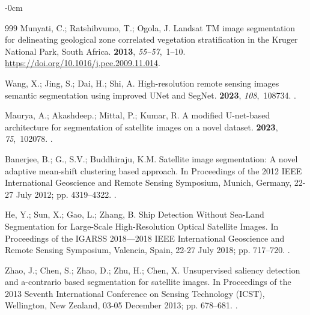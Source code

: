 \documentclass[analytics,article,accept,pdftex,moreauthors]{Definitions/mdpi}
\begin{document}
\begin{adjustwidth}{-\extralength}{0cm}
\begin{thebibliography}{999}
Munyati, C.; Ratshibvumo, T.; Ogola, J.
\newblock Landsat TM image segmentation for delineating geological zone
  correlated vegetation stratification in the Kruger National Park, South
  Africa.
 {\bf 2013},
  {\em 55--57},~1--10.
\newblock %
  {\url{https://doi.org/10.1016/j.pce.2009.11.014}}.

Wang, X.; Jing, S.; Dai, H.; Shi, A.
\newblock High-resolution remote sensing images semantic segmentation using
  improved UNet and SegNet.
 {\bf 2023}, {\em
  108},~108734.
.

Maurya, A.; Akashdeep.; Mittal, P.; Kumar, R.
\newblock A modified U-net-based architecture for segmentation of satellite
  images on a novel dataset.
 {\bf 2023}, {\em 75},~102078.
.

Banerjee, B.; G., S.V.; Buddhiraju, K.M.
\newblock Satellite image segmentation: A novel adaptive mean-shift clustering
  based approach.
\newblock In Proceedings of the 2012 IEEE International Geoscience and Remote
  Sensing Symposium, Munich, Germany, 22-27 July 2012; pp. 4319--4322.
.

He, Y.; Sun, X.; Gao, L.; Zhang, B.
\newblock Ship Detection Without Sea-Land Segmentation for Large-Scale
  High-Resolution Optical Satellite Images.
\newblock In Proceedings of the IGARSS 2018---2018 IEEE International
  Geoscience and Remote Sensing Symposium, Valencia, Spain, 22-27 July 2018; pp. 717--720.
.

Zhao, J.; Chen, S.; Zhao, D.; Zhu, H.; Chen, X.
\newblock Unsupervised saliency detection and a-contrario based segmentation
  for satellite images.
\newblock In Proceedings of the 2013 Seventh International Conference on
  Sensing Technology (ICST), Wellington, New Zealand, 03-05 December 2013; pp. 678--681.
.


\end{thebibliography}
\end{adjustwidth}
\end{document}
